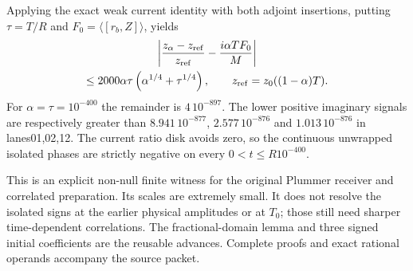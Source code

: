 Applying the exact weak current identity with both adjoint insertions,
putting $\tau=T/R$ and $F_0=\langle[r_b,Z]\rangle$, yields
\[
 \begin{gathered}
 \left|\frac{z_\alpha-z_{\rm ref}}{z_{\rm ref}}
                  -\frac{i\alpha TF_0}{M}\right|\\
 \le 2000\alpha\tau\left(\alpha^{1/4}+\tau^{1/4}\right),
 \qquad z_{\rm ref}=z_0((1-\alpha)T).
 \end{gathered}
\]
For $\alpha=\tau=10^{-400}$ the remainder is $4\,10^{-897}$.
The lower positive imaginary signals are respectively greater than
$8.941\,10^{-877}$, $2.577\,10^{-876}$ and $1.013\,10^{-876}$ in
lanes01,02,12. The current ratio disk avoids zero, so the continuous
unwrapped isolated phases are strictly negative on every
$0<t\le R10^{-400}$.

This is an explicit non-null finite witness for the original Plummer
receiver and correlated preparation. Its scales are extremely small.
It does not resolve the isolated signs at the earlier physical amplitudes
or at $T_0$; those still need sharper time-dependent correlations.
The fractional-domain lemma and three signed initial coefficients are the
reusable advances. Complete proofs and exact rational operands accompany
the source packet.
